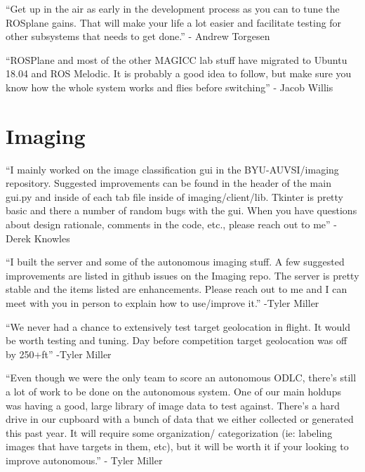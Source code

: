 \documentclass[]{auvsi_doc}
\begin{document}
{}

{``Get up in the air as early in the development process as you can to
tune the ROSplane gains. That will make your life a lot easier and
facilitate testing for other subsystems that needs to get done.'' -
Andrew Torgesen}

{}

{``ROSPlane and most of the other MAGICC lab stuff have migrated to
Ubuntu 18.04 and ROS Melodic. It is probably a good idea to follow, but
make sure you know how the whole system works and flies before
switching'' - Jacob Willis}

\section{Imaging}

{}

{``I mainly worked on the image classification gui in the
BYU-AUVSI/imaging repository. Suggested improvements can be found in the
header of the main gui.py and inside of each tab file inside of
imaging/client/lib. Tkinter is pretty basic and there a number of random
bugs with the gui. When you have questions about design rationale,
comments in the code, etc., please reach out to me'' - Derek Knowles}

{}

{``I built the server and some of the autonomous imaging stuff. A few
suggested improvements are listed in github issues on the Imaging repo.
The server is pretty stable and the items listed are enhancements.
Please reach out to me and I can meet with you in person to explain how
to use/improve it.'' -Tyler Miller}

{}

{``We never had a chance to extensively test target geolocation in
flight. It would be worth testing and tuning. Day before competition
target geolocation was off by 250+ft'' -Tyler Miller}

{}

{``Even though we were the only team to score an autonomous ODLC,
there's still a lot of work to be done on the autonomous system. One of
our main holdups was having a good, large library of image data to test
against. There's a hard drive in our cupboard with a bunch of data that
we either collected or generated this past year. It will require some
organization/ categorization (ie: labeling images that have targets in
them, etc), but it will be worth it if your looking to improve
autonomous.'' - Tyler Miller}
\end{document}
